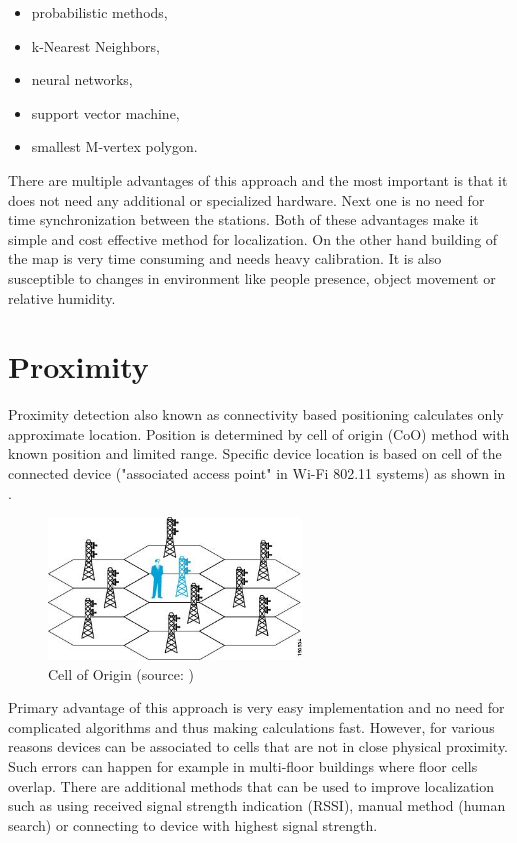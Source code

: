 \begin{itemize}
	\item probabilistic methods,
	\item k-Nearest Neighbors,
	\item neural networks,
	\item support vector machine,
	\item smallest M-vertex polygon.
\end{itemize}

There are multiple advantages of this approach and the most important is that it does not need any additional or specialized hardware. Next one is no need for time synchronization between the stations. Both of these advantages make it simple and cost effective method for localization. On the other hand building of the map is very time consuming and needs heavy calibration. It is also susceptible to changes in environment like people presence, object movement or relative humidity.\cite{IILUBLEB}\cite{RSSFofIFD}

\section{Proximity}\label{sec:Proximity}
Proximity detection also known as connectivity based positioning calculates only approximate location. Position is determined by cell of origin (CoO) method with known position and limited range.\cite{RAinWILTaS} Specific device location is based on cell of the connected device ("associated access point" in Wi-Fi 802.11 systems) as shown in .\cite{WiFiLBS}

\begin{figure}[h!]
	\begin{centering}
		\includegraphics[width=0.6\textwidth]{img/cell_of_origin}
		\par\end{centering}
	\caption{Cell of Origin (source: \cite{WiFiLBS})\label{fig:CellOfOrigin}}
	\label{fig5}
\end{figure}

Primary advantage of this approach is very easy implementation and no need for complicated algorithms and thus making calculations fast. However, for various reasons devices can be associated to cells that are not in close physical proximity. Such errors can happen for example in multi-floor buildings where floor cells overlap. There are additional methods that can be used to improve localization such as using received signal strength indication (RSSI), manual method (human search) or connecting to device with highest signal strength.\cite{WiFiLBS}\cite{RAinWILTaS}

